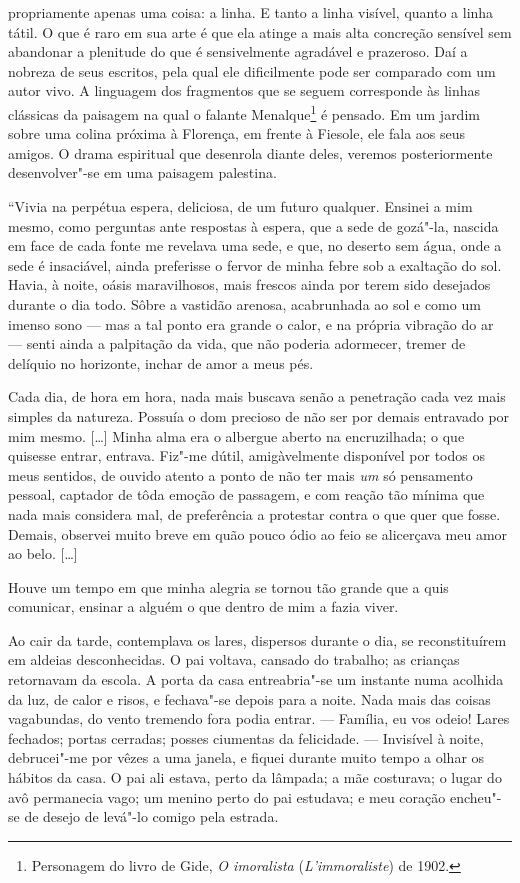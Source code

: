 propriamente apenas uma coisa: a linha. E tanto a linha visível,
quanto a linha tátil. O que é raro em sua arte é que ela atinge
a mais alta concreção sensível sem abandonar a plenitude do que é
sensivelmente agradável e prazeroso. Daí a nobreza de seus escritos, pela
qual ele dificilmente pode ser comparado com um autor vivo. A
linguagem dos fragmentos que se seguem corresponde às linhas clássicas
da paisagem na qual o falante Menalque\footnote{Personagem do
  livro de Gide, \emph{O imoralista} (\emph{L'immoraliste}) de 1902. \versal{[N. T.]}} é
pensado. Em um jardim sobre uma colina próxima à Florença, em frente à
Fiesole, ele fala aos seus amigos. O drama espiritual que desenrola
diante deles, veremos posteriormente desenvolver"-se em uma paisagem
palestina.

``Vivia na perpétua espera, deliciosa, de um futuro qualquer. Ensinei a
mim mesmo, como perguntas ante respostas à espera, que a sede de
gozá"-la, nascida em face de cada fonte me revelava uma sede, e que, no
deserto sem água, onde a sede é insaciável, ainda preferisse o fervor de
minha febre sob a exaltação do sol. Havia, à noite, oásis maravilhosos,
mais frescos ainda por terem sido desejados durante o dia todo. Sôbre a
vastidão arenosa, acabrunhada ao sol e como um imenso sono --- mas a tal
ponto era grande o calor, e na própria vibração do ar --- senti ainda a
palpitação da vida, que não poderia adormecer, tremer de delíquio no
horizonte, inchar de amor a meus pés.

Cada dia, de hora em hora, nada mais buscava senão a penetração cada vez
mais simples da natureza. Possuía o dom precioso de não ser por demais
entravado por mim mesmo. {[}\ldots{}{]} Minha alma era o albergue aberto na
encruzilhada; o que quisesse entrar, entrava. Fiz"-me dútil,
amigàvelmente disponível por todos os meus sentidos, de ouvido atento a
ponto de não ter mais \emph{um} só pensamento pessoal, captador de tôda
emoção de passagem, e com reação tão mínima que nada mais considera mal,
de preferência a protestar contra o que quer que fosse. Demais, observei
muito breve em quão pouco ódio ao feio se alicerçava meu amor ao belo.
{[}\ldots{}{]}

Houve um tempo em que minha alegria se tornou tão grande que a quis
comunicar, ensinar a alguém o que dentro de mim a fazia viver.

Ao cair da tarde, contemplava os lares, dispersos durante o dia, se
reconstituírem em aldeias desconhecidas. O pai voltava, cansado do
trabalho; as crianças retornavam da escola. A porta da casa
entreabria"-se um instante numa acolhida da luz, de calor e risos, e
fechava"-se depois para a noite. Nada mais das coisas vagabundas, do
vento tremendo fora podia entrar. --- Família, eu vos odeio! Lares
fechados; portas cerradas; posses ciumentas da felicidade. --- Invisível
à noite, debrucei"-me por vêzes a uma janela, e fiquei durante muito
tempo a olhar os hábitos da casa. O pai ali estava, perto da lâmpada; a
mãe costurava; o lugar do avô permanecia vago; um menino perto do pai
estudava; e meu coração encheu"-se de desejo de levá"-lo comigo pela
estrada.

